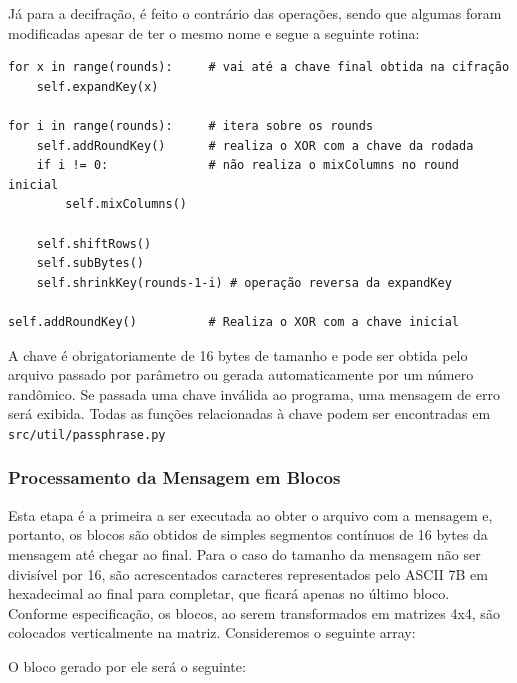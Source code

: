 \documentclass[12pt]{article}
\begin{document}
Já para a decifração, é feito o contrário das operações, sendo que algumas foram modificadas apesar de ter o mesmo nome e segue a seguinte rotina:

\begin{lstlisting}
for x in range(rounds):     # vai até a chave final obtida na cifração
    self.expandKey(x)

for i in range(rounds):     # itera sobre os rounds
    self.addRoundKey()      # realiza o XOR com a chave da rodada
    if i != 0:              # não realiza o mixColumns no round inicial
        self.mixColumns()

    self.shiftRows()
    self.subBytes()
    self.shrinkKey(rounds-1-i) # operação reversa da expandKey
    
self.addRoundKey()          # Realiza o XOR com a chave inicial
\end{lstlisting}

A chave é obrigatoriamente de 16 bytes de tamanho e pode ser obtida pelo arquivo passado por parâmetro ou gerada automaticamente por um número randômico. Se passada uma chave inválida ao programa, uma mensagem de erro será exibida. Todas as funções relacionadas à chave podem ser encontradas em \texttt{src/util/passphrase.py}

\subsubsection{Processamento da Mensagem em Blocos}
Esta etapa é a primeira a ser executada ao obter o arquivo com a mensagem e, portanto, os blocos são obtidos de simples segmentos contínuos de 16 bytes da mensagem até chegar ao final. Para o caso do tamanho da mensagem não ser divisível por 16, são acrescentados caracteres representados pelo ASCII 7B em hexadecimal ao final para completar, que ficará apenas no último bloco. Conforme especificação, os blocos, ao serem transformados em matrizes 4x4, são colocados verticalmente na matriz. Consideremos o seguinte array:

\begin{center}
\end{center}

O bloco gerado por ele será o seguinte:

\begin{center}
\end{center}
\end{document}
